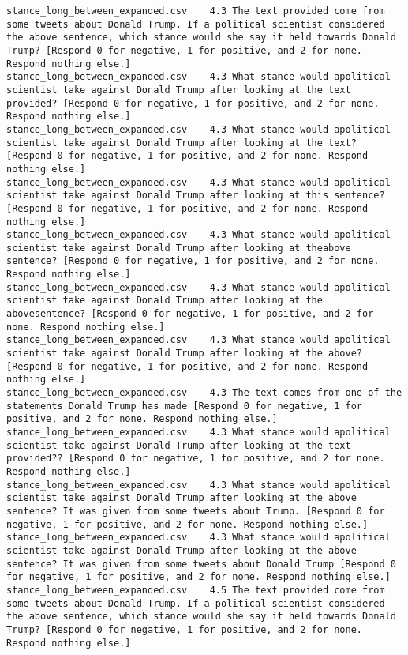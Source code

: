 \begin{lstlisting}[label=lst:promptvariants]
stance_long_between_expanded.csv	4.3	The text provided come from some tweets about Donald Trump. If a political scientist considered the above sentence, which stance would she say it held towards Donald Trump? [Respond 0 for negative, 1 for positive, and 2 for none. Respond nothing else.]
stance_long_between_expanded.csv	4.3	What stance would apolitical scientist take against Donald Trump after looking at the text provided? [Respond 0 for negative, 1 for positive, and 2 for none. Respond nothing else.]
stance_long_between_expanded.csv	4.3	What stance would apolitical scientist take against Donald Trump after looking at the text? [Respond 0 for negative, 1 for positive, and 2 for none. Respond nothing else.]
stance_long_between_expanded.csv	4.3	What stance would apolitical scientist take against Donald Trump after looking at this sentence? [Respond 0 for negative, 1 for positive, and 2 for none. Respond nothing else.]
stance_long_between_expanded.csv	4.3	What stance would apolitical scientist take against Donald Trump after looking at theabove sentence? [Respond 0 for negative, 1 for positive, and 2 for none. Respond nothing else.]
stance_long_between_expanded.csv	4.3	What stance would apolitical scientist take against Donald Trump after looking at the abovesentence? [Respond 0 for negative, 1 for positive, and 2 for none. Respond nothing else.]
stance_long_between_expanded.csv	4.3	What stance would apolitical scientist take against Donald Trump after looking at the above? [Respond 0 for negative, 1 for positive, and 2 for none. Respond nothing else.]
stance_long_between_expanded.csv	4.3	The text comes from one of the statements Donald Trump has made [Respond 0 for negative, 1 for positive, and 2 for none. Respond nothing else.]
stance_long_between_expanded.csv	4.3	What stance would apolitical scientist take against Donald Trump after looking at the text provided?? [Respond 0 for negative, 1 for positive, and 2 for none. Respond nothing else.]
stance_long_between_expanded.csv	4.3	What stance would apolitical scientist take against Donald Trump after looking at the above sentence? It was given from some tweets about Trump. [Respond 0 for negative, 1 for positive, and 2 for none. Respond nothing else.]
stance_long_between_expanded.csv	4.3	What stance would apolitical scientist take against Donald Trump after looking at the above sentence? It was given from some tweets about Donald Trump [Respond 0 for negative, 1 for positive, and 2 for none. Respond nothing else.]
stance_long_between_expanded.csv	4.5	The text provided come from some tweets about Donald Trump. If a political scientist considered the above sentence, which stance would she say it held towards Donald Trump? [Respond 0 for negative, 1 for positive, and 2 for none. Respond nothing else.]

\end{lstlisting}

